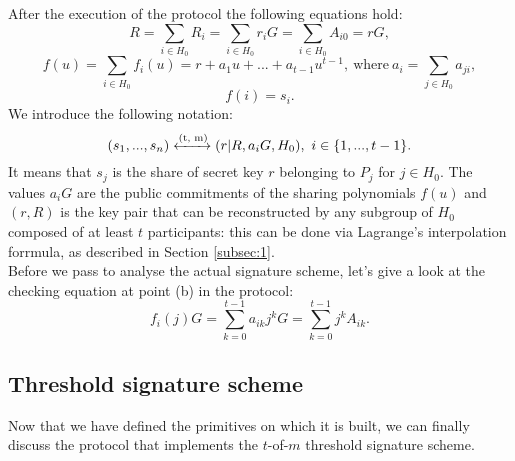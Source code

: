 After the execution of the protocol the following equations hold:
$$R = \sum_{i \in H_0} R_i = \sum_{i \in H_0}r_iG = \sum_{i \in H_0}A_{i0} = rG,$$
$$f(u) = \sum_{i \in H_0} f_i(u) = r + a_1u + ... + a_{t - 1}u^{t - 1}, \ \text{where} \ a_i = \sum_{j \in H_0}a_{ji},$$
$$f(i) = s_i.$$
We introduce the following notation: 
$$(s_1, ..., s_n) \xleftrightarrow{\text{(t, m)}} (r|R, a_iG, H_0), \ i \in \{1, ..., t - 1\}.$$
It means that $s_j$ is the share of secret key $r$ belonging to $P_j$ for $j \in H_0$. The values $a_iG$
are the public commitments of the sharing polynomials $f(u)$ and $(r, R)$ is the key pair that can be reconstructed by any subgroup of $H_0$ composed of at least $t$ participants: this can be done via Lagrange's interpolation forrmula, as described in Section \ref{subsec:1}.
\\
Before we pass to analyse the actual signature scheme, let's give a look at the checking equation at point (b) in the protocol:
$$f_i(j)G = \sum_{k = 0}^{t - 1}a_{ik}j^kG = \sum_{k = 0}^{t - 1}j^kA_{ik}.$$

\subsection{Threshold signature scheme}
Now that we have defined the primitives on which it is built, we can finally discuss the protocol that implements the $t$-of-$m$ threshold signature scheme. 

